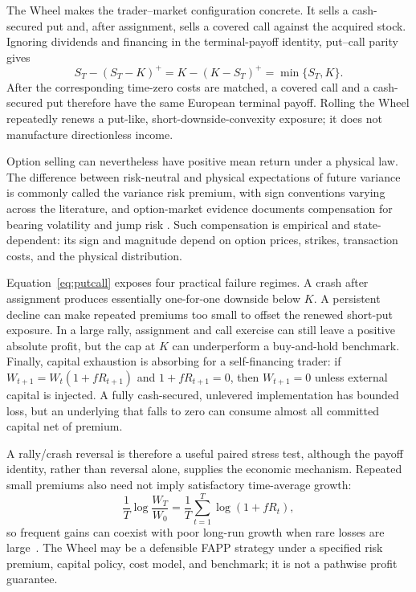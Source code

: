 \documentclass[aps,pra,reprint,superscriptaddress,amsmath,amssymb,floatfix]{revtex4-2}
\theoremstyle{plain}
\theoremstyle{definition}
\theoremstyle{remark}
\begin{document}
The Wheel makes the trader--market configuration concrete. It sells a
cash-secured put and, after assignment, sells a covered call against the
acquired stock. Ignoring dividends and financing in the terminal-payoff
identity, put--call parity gives
\begin{equation}
  S_T-(S_T-K)^+
  =K-(K-S_T)^+
  =\min\{S_T,K\}.
  \label{eq:putcall}
\end{equation}
After the corresponding time-zero costs are matched, a covered call and a
cash-secured put therefore have the same European terminal payoff. Rolling the
Wheel repeatedly renews a put-like, short-downside-convexity exposure; it does
not manufacture directionless income.

Option selling can nevertheless have positive mean return under a physical
law. The
difference between risk-neutral and physical expectations of future variance
is commonly called the variance risk premium, with sign conventions varying
across the literature, and option-market evidence documents compensation for
bearing volatility and jump risk
\cite{BakshiKapadia2003,CarrWu2009}. Such compensation is empirical and
state-dependent: its sign and magnitude depend on option prices, strikes,
transaction costs, and the physical distribution.

Equation~\eqref{eq:putcall} exposes four practical failure regimes. A crash
after assignment produces essentially one-for-one downside below \(K\). A
persistent decline can make repeated premiums too small to offset the renewed
short-put exposure. In a large rally, assignment and call exercise can still
leave a positive absolute profit, but the cap at \(K\) can underperform a
buy-and-hold benchmark. Finally, capital exhaustion is absorbing for a
self-financing trader: if \(W_{t+1}=W_t(1+fR_{t+1})\) and
\(1+fR_{t+1}=0\), then \(W_{t+1}=0\) unless external capital is injected. A
fully cash-secured, unlevered implementation has bounded loss, but an
underlying that falls to zero can consume almost all committed capital net of
premium.

A rally/crash reversal is therefore a useful paired stress test, although the
payoff identity, rather than reversal alone, supplies the economic mechanism.
Repeated small premiums also need not imply satisfactory time-average growth:
\[
  \frac1T\log\frac{W_T}{W_0}
  =\frac1T\sum_{t=1}^T\log(1+fR_t),
\]
so frequent gains can coexist with poor long-run growth when rare losses are
large~\cite{Peters2019}. The Wheel may be a defensible FAPP strategy under a
specified risk premium, capital policy, cost model, and benchmark; it is not a
pathwise profit guarantee.
\end{document}
